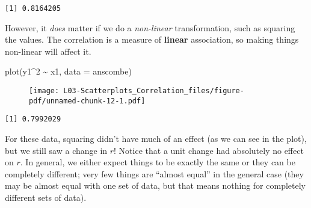 \documentclass[
  letterpaper,
  DIV=11,
  numbers=noendperiod]{scrreprt}
\newenvironment{Shaded}{\begin{snugshade}}{\end{snugshade}}
\newcommand{\AttributeTok}[1]{\textcolor[rgb]{0.40,0.45,0.13}{#1}}
\newcommand{\DecValTok}[1]{\textcolor[rgb]{0.68,0.00,0.00}{#1}}
\newcommand{\FunctionTok}[1]{\textcolor[rgb]{0.28,0.35,0.67}{#1}}
\newcommand{\NormalTok}[1]{\textcolor[rgb]{0.00,0.23,0.31}{#1}}
\newcommand{\SpecialCharTok}[1]{\textcolor[rgb]{0.37,0.37,0.37}{#1}}
\begin{document}
\begin{Shaded}
\end{Shaded}

\begin{verbatim}
[1] 0.8164205
\end{verbatim}

However, it \emph{does} matter if we do a \emph{non-linear}
transformation, such as squaring the values. The correlation is a
measure of \textbf{linear} association, so making things non-linear will
affect it.

\begin{Shaded}
\begin{Highlighting}[]
\FunctionTok{plot}\NormalTok{(y1}\SpecialCharTok{\^{}}\DecValTok{2} \SpecialCharTok{\textasciitilde{}}\NormalTok{ x1, }\AttributeTok{data =}\NormalTok{ anscombe)}
\end{Highlighting}
\end{Shaded}

\begin{figure}[H]

{\centering \texttt{[image: L03-Scatterplots\_Correlation\_files/figure-pdf/unnamed-chunk-12-1.pdf]}

}

\end{figure}

\begin{Shaded}
\end{Shaded}

\begin{verbatim}
[1] 0.7992029
\end{verbatim}

For these data, squaring didn't have much of an effect (as we can see in
the plot), but we still saw a change in \(r\)! Notice that a unit change
had absolutely no effect on \(r\). In general, we either expect things
to be exactly the same or they can be completely different; very few
things are ``almost equal'' in the general case (they may be almost
equal with one set of data, but that means nothing for completely
different sets of data).
\end{document}
